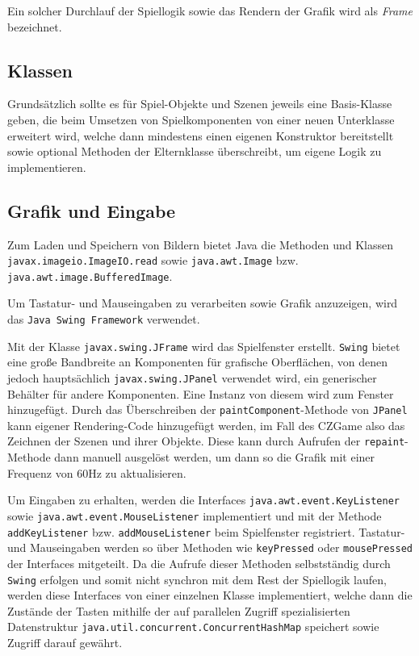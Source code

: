 Ein solcher Durchlauf der Spiellogik sowie das Rendern der Grafik
wird als \textit{Frame} bezeichnet.


\subsection{Klassen}

Grundsätzlich sollte es für Spiel-Objekte und Szenen jeweils eine
Basis-Klasse geben, die beim Umsetzen von Spielkomponenten von einer
neuen Unterklasse erweitert wird, welche dann mindestens einen eigenen
Konstruktor bereitstellt sowie optional Methoden der Elternklasse
überschreibt, um eigene Logik zu implementieren.


\subsection{Grafik und Eingabe} \label{idee:engine:grafik-eingabe}

\begin{sloppypar}

Zum Laden und Speichern von Bildern bietet Java die Methoden
und Klassen \texttt{javax.imageio.ImageIO.read} sowie
\texttt{java.awt.Image} bzw. \texttt{java.awt.image.BufferedImage}.

Um Tastatur- und Mauseingaben zu verarbeiten sowie Grafik
anzuzeigen, wird das \texttt{Java Swing Framework} verwendet.

Mit der Klasse \texttt{javax.swing.JFrame} wird das Spielfenster
erstellt. \texttt{Swing} bietet eine große
Bandbreite an Komponenten für grafische Oberflächen, von denen
jedoch hauptsächlich \texttt{javax.swing.JPanel} verwendet wird,
ein generischer Behälter für andere Komponenten. Eine Instanz von
diesem wird zum Fenster hinzugefügt. Durch das Überschreiben der
\texttt{paintComponent}-Methode von \texttt{JPanel} kann eigener
Rendering-Code hinzugefügt werden, im Fall des CZGame also
das Zeichnen der Szenen und ihrer Objekte. Diese kann durch
Aufrufen der \texttt{repaint}-Methode dann manuell ausgelöst werden,
um dann so die Grafik mit einer Frequenz von 60Hz zu aktualisieren.

Um Eingaben zu erhalten, werden die Interfaces \texttt{java.awt.event.KeyListener}
sowie \texttt{java.awt.event.MouseListener} implementiert und mit
der Methode \texttt{addKeyListener} bzw. \texttt{addMouseListener}
beim Spielfenster registriert. Tastatur- und Mauseingaben werden
so über Methoden wie \texttt{keyPressed} oder \texttt{mousePressed}
der Interfaces mitgeteilt. Da die Aufrufe dieser Methoden selbstständig
durch \texttt{Swing} erfolgen und somit nicht synchron mit dem
Rest der Spiellogik laufen, werden diese Interfaces von einer einzelnen
Klasse implementiert, welche dann die Zustände der Tasten mithilfe der
auf parallelen Zugriff spezialisierten Datenstruktur
\texttt{java.util.concurrent.ConcurrentHashMap} speichert sowie
Zugriff darauf gewährt.
\end{sloppypar}


